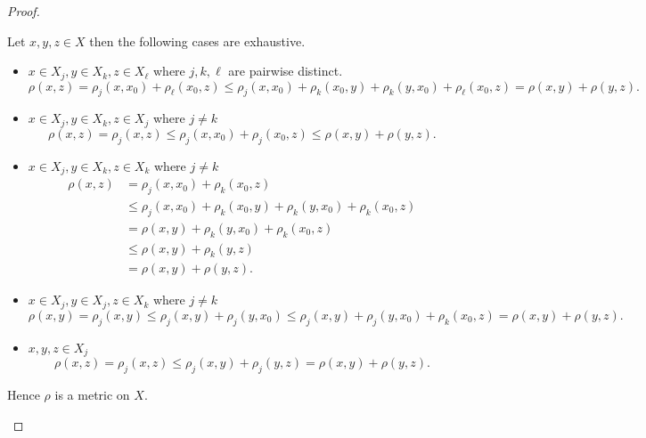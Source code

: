 \begin{proof}
\begin{enumerate}[label={(\alph*)}]
		      Let \( x, y, z \in X \) then the following cases are exhaustive.
		      \begin{itemize}
			      \item \( x \in X_{j}, y \in X_{k}, z \in X_{\ell} \) where \( j, k, \ell \) are pairwise distinct.
			            \[
				            \rho(x, z) = \rho_{j}(x, x_{0}) + \rho_{\ell}(x_{0}, z) \le \rho_{j}(x, x_{0}) + \rho_{k}(x_{0}, y) + \rho_{k}(y, x_{0}) + \rho_{\ell}(x_{0}, z) = \rho(x, y) + \rho(y, z).
			            \]
			      \item \( x \in X_{j}, y \in X_{k}, z \in X_{j} \) where \( j \ne k \)
			            \[
				            \rho(x, z) = \rho_{j}(x, z) \le \rho_{j}(x, x_{0}) + \rho_{j}(x_{0}, z) \le \rho(x, y) + \rho(y, z).
			            \]
			      \item \( x \in X_{j}, y \in X_{k}, z \in X_{k} \) where \( j \ne k \)
			            \begingroup
			            \allowdisplaybreaks%
			            \begin{align*}
				            \rho(x, z) & = \rho_{j}(x, x_{0}) + \rho_{k}(x_{0}, z)                                             \\
				                       & \le \rho_{j}(x, x_{0}) + \rho_{k}(x_{0}, y) + \rho_{k}(y, x_{0}) + \rho_{k}(x_{0}, z) \\
				                       & = \rho(x, y) + \rho_{k}(y, x_{0}) + \rho_{k}(x_{0}, z)                                \\
				                       & \le \rho(x, y) + \rho_{k}(y, z)                                                       \\
				                       & = \rho(x, y) + \rho(y, z).
			            \end{align*}
			            \endgroup
			      \item \( x \in X_{j}, y \in X_{j}, z \in X_{k} \) where \( j \ne k \)
			            \[
				            \rho(x, y) = \rho_{j}(x, y) \le \rho_{j}(x, y) + \rho_{j}(y, x_{0}) \le \rho_{j}(x, y) + \rho_{j}(y, x_{0}) + \rho_{k}(x_{0}, z) = \rho(x, y) + \rho(y, z).
			            \]
			      \item \( x, y, z \in X_{j} \)
			            \[
				            \rho(x, z) = \rho_{j}(x, z) \le \rho_{j}(x, y) + \rho_{j}(y, z) = \rho(x, y) + \rho(y, z).
			            \]
		      \end{itemize}

		      Hence \( \rho \) is a metric on \( X \).
	\end{enumerate}
\end{proof}

